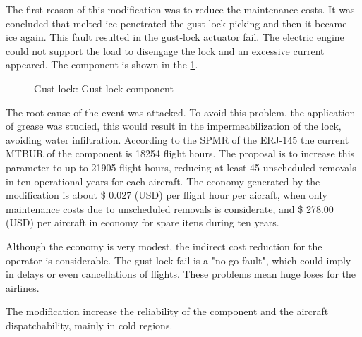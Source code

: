 The first reason of this modification was to reduce the maintenance costs. It was concluded that melted ice penetrated the gust-lock picking and then it became ice again. This fault resulted in the gust-lock actuator fail. The electric engine could not support the load to disengage the lock and an excessive current appeared. The component is shown in the \ref{fig:GL}.

\begin{figure}[H] %
\caption{Gust-lock: Gust-lock component}
\label{fig:GL}
\end{figure}

The root-cause of the event was attacked. To avoid this problem, the application of grease was studied, this would result in the impermeabilization of the lock, avoiding water infiltration.
According to the SPMR of the ERJ-145 the current MTBUR of the component is 18254 flight hours. The proposal is to increase this parameter to up to 21905 flight hours, reducing at least 45 unscheduled removals in ten operational years for each aircraft. The economy generated by the modification is about \$ 0.027 (USD) per flight hour per aicraft, when only maintenance costs due to unscheduled removals is considerate, and \$ 278.00 (USD) per aircraft in economy for spare itens during ten years.

Although the economy is very modest, the indirect cost reduction for the operator is considerable. The gust-lock fail is a "no go fault", which could imply in delays or even cancellations of flights. These problems mean huge loses for the airlines.

The modification increase the reliability of the component and the aircraft dispatchability, mainly in cold regions.
